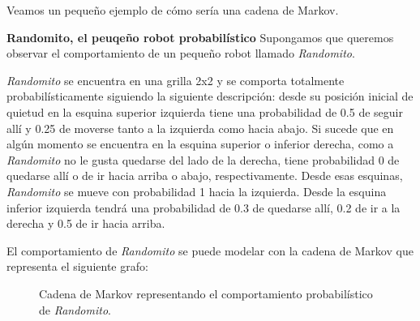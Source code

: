 Veamos un pequeño ejemplo de cómo sería una cadena de Markov.

\textbf{Randomito, el peuqeño robot probabilístico}
Supongamos que queremos observar el comportamiento de un pequeño robot llamado \textit{Randomito}.

\textit{Randomito} se encuentra en una grilla 2x2 y se comporta totalmente probabilísticamente siguiendo la siguiente descripción: desde su posición inicial de quietud en la esquina superior izquierda tiene una probabilidad de 0.5 de seguir allí y 0.25 de moverse tanto a la izquierda como hacia abajo. Si sucede que en algún momento se encuentra en la esquina superior o inferior derecha, como a \emph{Randomito} no le gusta quedarse del lado de la derecha, tiene probabilidad 0 de quedarse allí o de ir hacia arriba o abajo, respectivamente. Desde esas esquinas, \emph{Randomito} se mueve con probabilidad 1 hacia la izquierda. Desde la esquina inferior izquierda tendrá una probabilidad de 0.3 de quedarse allí, 0.2 de ir a la derecha y 0.5 de ir hacia arriba.

El comportamiento de \emph{Randomito} se puede modelar con la cadena de Markov
que representa el siguiente grafo:

\begin{figure}[h]
	\centering
	\caption{Cadena de Markov representando el comportamiento probabilístico de \emph{Randomito}.}
	\label{fig:cm-randomito}
\end{figure}

